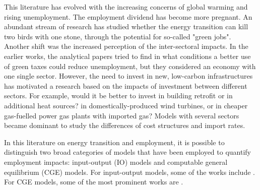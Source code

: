 This literature has evolved with the increasing concerns of global warming and rising unemployment. The employment dividend has become more pregnant. An abundant stream of research has studied whether the energy transition can kill two birds with one stone, through the potential for so-called "green jobs".
Another shift was the increased perception of the inter-sectoral impacts.
In the earlier works, the analytical papers \citep{Bovenberg1994, Bovenberg1996} tried to find in what conditions a better use of green taxes could reduce unemployment, but they considered an economy with one single sector.
However, the need to invest in new, low-carbon infrastructures has motivated a research based on the impacts of investment between different sectors. For example, would it be better to invest in building retrofit or in additional heat sources? in domestically-produced wind turbines, or in cheaper gas-fuelled power gas plants with imported gas? 
Models with several sectors became dominant to study the differences of cost structures and import rates.

In this literature on energy transition and employment, it is possible to distinguish two broad categories of models that have been employed to quantify employment impacts: input-output (IO) models and computable general equilibrium (CGE) models.
For input-output models, some of the works include \citet{Hillebrand2006, Scott2008, deArce2012, Markaki2013, Hartwig2016, Yushchenko2016, Li2016, Garrett2017}.
For CGE models, some of the most prominent works are \citet{Lehr2008, Lehr2012, Bohringer2013, Blazejczak2014, Creutzig2014, Duscha2014, Duscha2016}.

